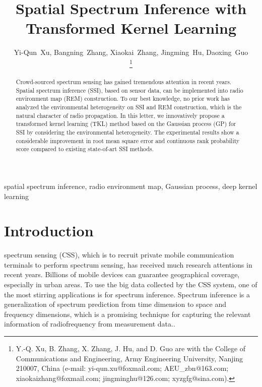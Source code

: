 \documentclass[journal, oneside, twocolumn]{IEEEtran}
\date{}
\title{Spatial Spectrum Inference with Transformed Kernel Learning}
\begin{document}
\author{
  Yi-Qun~Xu,
  Bangning~Zhang, %
  Xiaokai~Zhang, 
  Jingming~Hu, 
  Daoxing~Guo%

  \thanks{Y.-Q. Xu, B. Zhang, X. Zhang, J. Hu, and D. Guo are with the College of Communications and Engineering, Army Engineering University, Nanjing 210007, China (e-mail: yi-qun.xu@foxmail.com; AEU\_zbn@163.com; xiaokaizhang@foxmail.com; jingminghu@126.com; xyzgfg@sina.com).}
}


\maketitle

\begin{abstract}
Crowd-sourced spectrum sensing has gained tremendous attention in recent years. Spatial spectrum inference (SSI), based on sensor data, can be implemented into radio environment map (REM) construction. To our best knowledge, no prior work has analyzed the environmental heterogeneity on SSI and REM construction, which is the natural character of radio propagation. In this letter, we innovatively propose a transformed kernel learning (TKL) method based on the Gaussian process (GP) for SSI by considering the environmental heterogeneity. The experimental results show a considerable improvement in root mean square error and continuous rank probability score compared to existing state-of-art SSI methods.
\end{abstract}

\begin{IEEEkeywords}
  spatial spectrum inference, radio environment map, Gaussian process, deep kernel learning
\end{IEEEkeywords}

\section{Introduction}
 spectrum sensing (CSS), which is to recruit private mobile communication terminals to perform spectrum sensing, has received much research attentions \cite{Ding2014, Amin2020} in recent years. Billions of mobile devices can guarantee geographical coverage, especially in urban areas. To use the big data collected by the CSS system, one of the most stirring applications is for spectrum inference. Spectrum inference is a generalization of spectrum prediction from time dimension to space and frequency dimensions, which is a promising technique for capturing the relevant information of radiofrequency from measurement data.\cite{Ding2018}.
\end{document}
